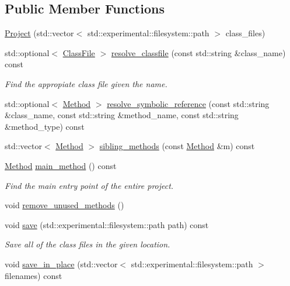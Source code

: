 \subsection*{Public Member Functions}
\begin{DoxyCompactItemize}
\item 
\hyperlink{classProject_aa263ab552c113e7a9db9e90c3dac0879}{Project} (std\+::vector$<$ std\+::experimental\+::filesystem\+::path $>$ class\+\_\+files)
\item 
std\+::optional$<$ \hyperlink{classfile_8h_a00b46b60bc40e813e9fb1bb049174346}{Class\+File} $>$ \hyperlink{classProject_a2ec0981bc841bcbac0ca8072f3b960b5}{resolve\+\_\+classfile} (const std\+::string \&class\+\_\+name) const
\begin{DoxyCompactList}\small\item\em Find the appropiate class file given the name. \end{DoxyCompactList}\item 
std\+::optional$<$ \hyperlink{classMethod}{Method} $>$ \hyperlink{classProject_a2bf65efcb1e91bfe76d2faab76127c11}{resolve\+\_\+symbolic\+\_\+reference} (const std\+::string \&class\+\_\+name, const std\+::string \&method\+\_\+name, const std\+::string \&method\+\_\+type) const
\item 
std\+::vector$<$ \hyperlink{classMethod}{Method} $>$ \hyperlink{classProject_afee58125bfee1c7a1871be7805e855fa}{sibling\+\_\+methods} (const \hyperlink{classMethod}{Method} \&m) const
\item 
\hyperlink{classMethod}{Method} \hyperlink{classProject_a8122de9e7b4bc2a63e1391727c881474}{main\+\_\+method} () const
\begin{DoxyCompactList}\small\item\em Find the main entry point of the entire project. \end{DoxyCompactList}\item 
void \hyperlink{classProject_af5f35c59d1175af1cfa659a597bb6353}{remove\+\_\+unused\+\_\+methods} ()
\item 
void \hyperlink{classProject_aff5e62e0e0e3e8c7123a7dd6ae51cb3f}{save} (std\+::experimental\+::filesystem\+::path path) const
\begin{DoxyCompactList}\small\item\em Save all of the class files in the given location. \end{DoxyCompactList}\item 
void \hyperlink{classProject_aecff214fd8b3fc5e855ec925ebe93f59}{save\+\_\+in\+\_\+place} (std\+::vector$<$ std\+::experimental\+::filesystem\+::path $>$ filenames) const

\end{DoxyCompactItemize}
